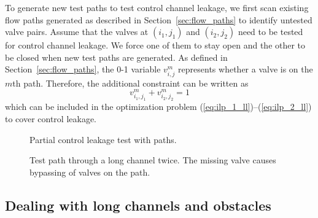 To generate new test paths to test control channel leakage, we first scan
existing flow paths generated as described in Section~\ref{sec:flow_paths} to
identify untested valve pairs.  
Assume that the valves at $(i_1,j_1)$ and $(i_2,j_2)$ 
need to be
tested for control channel leakage. We force one of them to stay open and the other to be
closed when new test paths are generated. As defined in 
Section~\ref{sec:flow_paths}, the 0-1 variable $v^m_{i,j}$ represents whether a
valve is on the $m$th path. Therefore, the additional constraint 
can be written as
\begin{equation}
v^m_{i_1,j_1}+v^m_{i_2,j_2}=1
\end{equation}
which can be included in the optimization problem
(\ref{eq:ilp_1_ll})--(\ref{eq:ilp_2_ll}) to cover control leakage.


\begin{figure}
{\figurefontsize
  \begin{minipage}[b]{0.20\textwidth}
    \centering
    
    \caption{Partial control leakage test with paths.}
    \label{fig:control_test}
  \end{minipage}
  \hspace{14pt}
  \begin{minipage}[b]{0.25\textwidth}
\centering

\caption{Test path through a long channel twice. The missing valve causes bypassing of valves on the path. }
\label{fig:long_channel}
  \end{minipage}
}
\end{figure}

\subsection{Dealing with long channels and obstacles}\label{sec:walls_holes}

